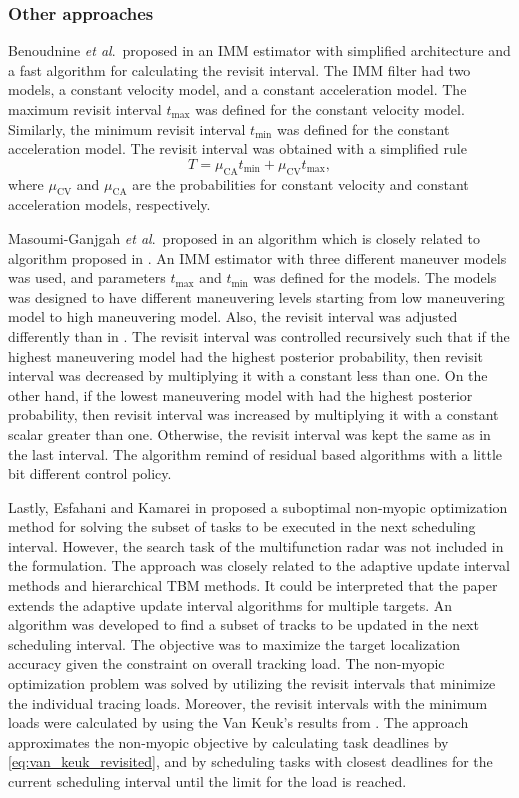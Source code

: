\documentclass[english, 12pt, a4paper, elec, utf8, a-1b, online]{aaltothesis}
\newcommand{\etal}{\textit{et al}.~}
\newcommand{\tmax}{t_\text{max}}
\newcommand{\tmin}{t_\text{min}}
\newcommand{\muca}{\mu_{\text{CA}}}
\newcommand{\mucv}{\mu_{\text{CV}}}
\begin{document}
\subsubsection{Other approaches}

Benoudnine \etal proposed in \cite{Benoudnine2006} an IMM estimator with simplified architecture and a fast algorithm for calculating the revisit interval.
The IMM filter had two models, a constant velocity model, and a constant acceleration model.
The maximum revisit interval $\tmax$ was defined for the constant velocity model.
Similarly, the minimum revisit interval $\tmin$ was defined for the constant acceleration model.
The revisit interval was obtained with a simplified rule
\begin{equation}
    T = \muca \tmin + \mucv \tmax,
\end{equation}
where $\mucv$ and $\muca$ are the probabilities for constant velocity and constant acceleration models, respectively.

Masoumi-Ganjgah \etal proposed in \cite{MasoumiGanjgah2017} an algorithm which is closely related to algorithm proposed in \cite{Benoudnine2006}.
An IMM estimator with three different maneuver models was used, and parameters $\tmax$ and $\tmin$ was defined for the models.
The models was designed to have different maneuvering levels starting from low maneuvering model to high maneuvering model.
Also, the revisit interval was adjusted differently than in \cite{Benoudnine2006}.
The revisit interval was controlled recursively such that if the highest maneuvering model had the highest posterior probability, then 
revisit interval was decreased by multiplying it with a constant less than one.
On the other hand, if the lowest maneuvering model with had the highest posterior probability, then
revisit interval was increased by multiplying it with a constant scalar greater than one.
Otherwise, the revisit interval was kept the same as in the last interval.
The algorithm remind of residual based algorithms with a little bit different control policy.

Lastly, Esfahani and Kamarei in \cite{Esfahani2012} proposed a suboptimal non-myopic optimization method for solving the subset of tasks to be executed in the next scheduling interval.
However, the search task of the multifunction radar was not included in the formulation.
The approach was closely related to the adaptive update interval methods and hierarchical TBM methods.
It could be interpreted that the paper extends the adaptive update interval algorithms for multiple targets.
An algorithm was developed to find a subset of tracks to be updated in the next scheduling interval.
The objective was to maximize the target localization accuracy given the constraint on overall tracking load.
The non-myopic optimization problem was solved by utilizing the revisit intervals that minimize the individual tracing loads.
Moreover, the revisit intervals with the minimum loads were calculated by using the Van Keuk's results from \cite{vanKeuk1993}.
The approach approximates the non-myopic objective by calculating task deadlines by \eqref{eq:van_keuk_revisited}, and by scheduling tasks with closest deadlines for the current scheduling interval until the limit for the load is reached.
\end{document}
